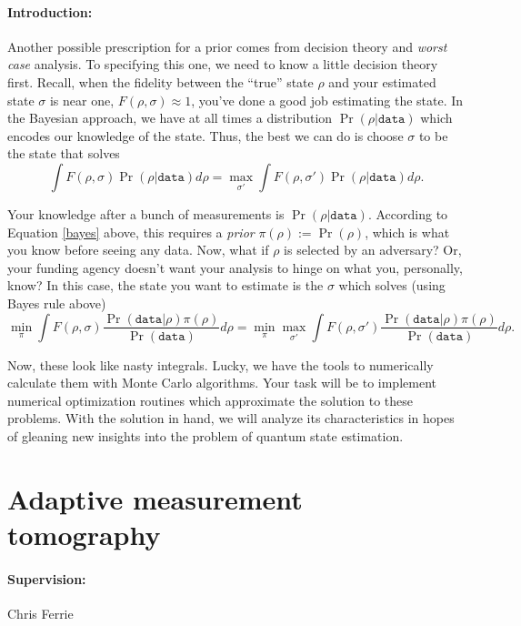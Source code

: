 \documentclass[aps,pra,onecolumn,nofootinbib,superscriptaddress,tightenlines,
notitlepage,12pt]{revtex4-1}
\begin{document}
\paragraph*{Introduction:} Another possible prescription for a prior comes from decision theory and \emph{worst case} analysis.  To specifying this one, we need to know a little decision theory first.  Recall, when the fidelity between the ``true'' state $\rho$ and your estimated state $\sigma$ is near one, $F(\rho,\sigma) \approx 1$, you've done a good job estimating the state.  In the Bayesian approach, we have at all times a distribution $\Pr(\rho|\texttt{data})$ which encodes our knowledge of the state.  Thus, the best we can do is choose $\sigma$ to be the state that solves
\begin{equation}
	\int F(\rho,\sigma) \Pr(\rho|\texttt{data}) d\rho = \max_{\sigma'}	\int F(\rho,\sigma') \Pr(\rho|\texttt{data}) d\rho.
\end{equation}

Your knowledge after a bunch of measurements is $\Pr(\rho|\texttt{data})$.  According to Equation \eqref{bayes} above, this requires a \emph{prior} $\pi(\rho):=\Pr(\rho)$, which is what you know before seeing any data.  Now, what if $\rho$ is selected by an adversary?  Or, your funding agency doesn't want your analysis to hinge on what you, personally, know?  In this case, the state you want to estimate is the $\sigma$ which solves (using Bayes rule above)
\begin{equation}
\min_\pi	\int F(\rho,\sigma) \frac{\Pr(\texttt{data}|\rho)\pi(\rho)}{\Pr(\texttt{data})} d\rho = \min_\pi \max_{\sigma'}	\int F(\rho,\sigma')  \frac{\Pr(\texttt{data}|\rho)\pi(\rho)}{\Pr(\texttt{data})} d\rho.
\end{equation}

Now, these look like nasty integrals.  Lucky, we have the tools to numerically calculate them with Monte Carlo algorithms.  Your task will be to implement numerical optimization routines which approximate the solution to these problems.  With the solution in hand, we will analyze its characteristics in hopes of gleaning new insights into the problem of quantum state estimation.



\section{Adaptive measurement tomography}

\paragraph*{Supervision:} Chris Ferrie
\end{document}
